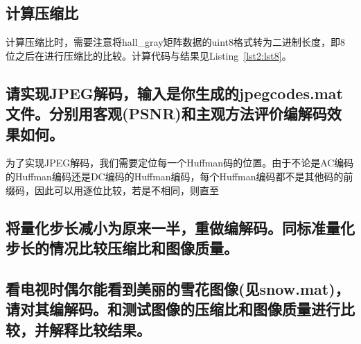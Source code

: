 \documentclass[a4paper]{article}
\begin{document}
	\subsection{计算压缩比}
	
	计算压缩比时，需要注意将hall\_gray矩阵数据的uint8格式转为二进制长度，即8位之后在进行压缩比的比较。计算代码与结果见Listing~\ref{lst2:lst8}。
		
	
	\subsection{请实现JPEG解码，输入是你生成的jpegcodes.mat文件。分别用客观(PSNR)和主观方法评价编解码效果如何。}
	
	为了实现JPEG解码，我们需要定位每一个Huffman码的位置。由于不论是AC编码的Huffman编码还是DC编码的Huffman编码，每个Huffman编码都不是其他码的前缀码，因此可以用逐位比较，若是不相同，则直至
	
		
	
	\subsection{将量化步长减小为原来一半，重做编解码。同标准量化步长的情况比较压缩比和图像质量。}
	
		
	
	\subsection{看电视时偶尔能看到美丽的雪花图像(见snow.mat)，请对其编解码。和测试图像的压缩比和图像质量进行比较，并解释比较结果。}
	
		
	
\end{document}
